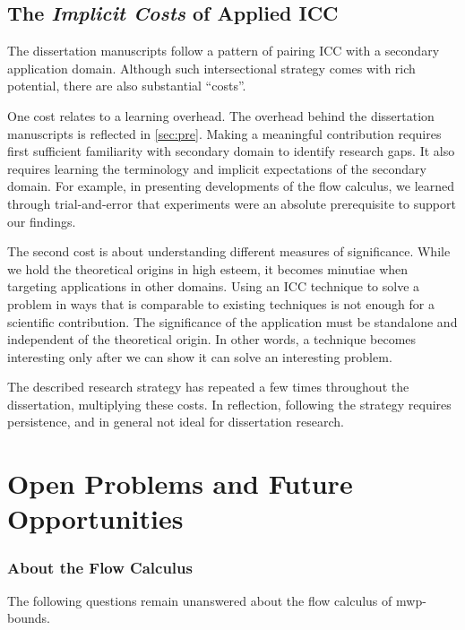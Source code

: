 \subsection{The \emph{Implicit Costs} of Applied ICC}
\label{subsec:res-meta}

The dissertation manuscripts follow a pattern of pairing ICC with a secondary application domain.
Although such intersectional strategy comes with rich potential, there are also substantial \enquote{costs}.

One cost relates to a learning overhead.
The overhead behind the dissertation manuscripts is reflected in \autoref{sec:pre}.
Making a meaningful contribution requires first sufficient familiarity with secondary domain to identify research gaps.
It also requires learning the terminology and implicit expectations of the secondary domain.
For example, in presenting developments of the flow calculus, we learned through trial-and-error that experiments were an absolute prerequisite to support our findings.

The second cost is about understanding different measures of significance.
While we hold the theoretical origins in high esteem, it becomes minutiae when targeting applications in other domains.
Using an ICC technique to solve a problem in ways that is comparable to existing techniques is not enough for a scientific contribution.
The significance of the application must be standalone and independent of the theoretical origin.
In other words, a technique becomes interesting only after we can show it can solve an interesting problem.

The described research strategy has repeated a few times throughout the dissertation, multiplying these costs.
In reflection, following the strategy requires persistence, and in general not ideal for dissertation research.

\section{Open Problems and Future Opportunities}
\label{sec:res-future}

\subsubsection{About the Flow Calculus}
\label{ssec:mwp-open}

The following questions remain unanswered about the flow calculus of
mwp-bounds.

